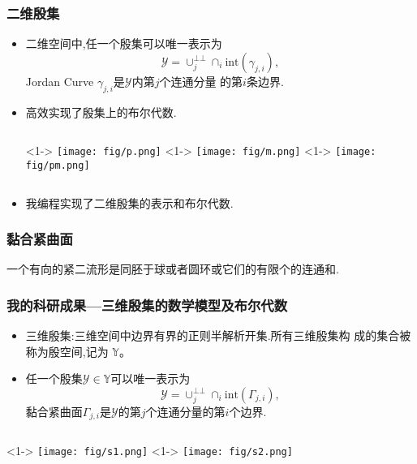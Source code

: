\documentclass[UTF8]{ctexbeamer}	%
\theoremstyle{plain}
\theoremstyle{definition}
\theoremstyle{remark}
\numberwithin{equation}{section}
\begin{document}
\begin{frame}
    \frametitle{二维殷集}
    \begin{itemize}
        \item 二维空间中,任一个殷集可以唯一表示为
        \[\mathcal{Y} = \cup_j^{\bot \bot}\cap_i \text{int}(\gamma_{j, i} ),\]
        Jordan Curve $\gamma_{j, i}$是$\mathcal{Y}$内第$j$个连通分量
        的第$i$条边界.
        \item 高效实现了殷集上的布尔代数. 
        \begin{columns}
            <1->
                \texttt{[image: fig/p.png]}
            <1->
            \texttt{[image: fig/m.png]}
            <1->
            \texttt{[image: fig/pm.png]}
        \end{columns}
        \item 我编程实现了二维殷集的表示和布尔代数.
    \end{itemize}
\end{frame}

\begin{frame}
    \frametitle{黏合紧曲面}
    \begin{definition}[二流形分类定理]
        一个有向的紧二流形是同胚于球或者圆环或它们的有限个的连通和.
    \end{definition}
\end{frame}

\begin{frame}
    \frametitle{我的科研成果---三维殷集的数学模型及布尔代数}
    \begin{itemize}
        \item 三维殷集:三维空间中边界有界的正则半解析开集.所有三维殷集构
        成的集合被称为殷空间,记为 $\mathbb{Y}$。
        \item 任一个殷集$\mathcal{Y} \in \mathbb{Y}$可以唯一表示为
        \[\mathcal{Y} = \cup_j^{\bot \bot} \cap_i \text{int}(\Gamma_{j, i}),\]
        黏合紧曲面$\Gamma_{j, i}$是$\mathcal{Y}$的第$j$个连通分量的第$i$个边界.
    \end{itemize}
    \begin{columns}
        <1->
            \texttt{[image: fig/s1.png]}
        <1->
        \texttt{[image: fig/s2.png]}
    \end{columns}
\end{frame}
\end{document}
